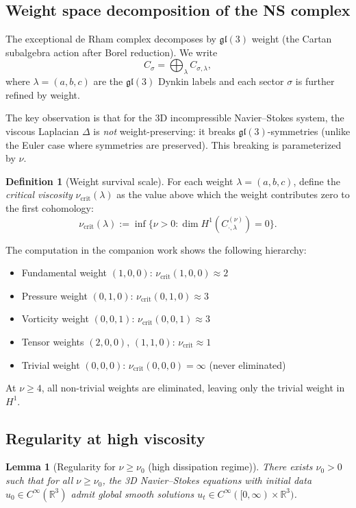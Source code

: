 \documentclass[reqno,10pt]{amsart}
\theoremstyle{plain}
\newtheorem{lemma}[theorem]{Lemma}
\theoremstyle{definition}
\newtheorem{definition}[theorem]{Definition}
\begin{document}
\subsection{Weight space decomposition of the NS complex}

The exceptional de Rham complex decomposes by $\mathfrak{gl}(3)$ weight (the Cartan subalgebra action after Borel reduction). We write
\[
  C_\sigma = \bigoplus_{\lambda} C_{\sigma,\lambda},
\]
where $\lambda = (a,b,c)$ are the $\mathfrak{gl}(3)$ Dynkin labels and each sector $\sigma$ is further refined by weight.

The key observation is that for the 3D incompressible Navier--Stokes system, the viscous Laplacian $\Delta$ is \emph{not} weight-preserving: it breaks $\mathfrak{gl}(3)$-symmetries (unlike the Euler case where symmetries are preserved). This breaking is parameterized by $\nu$.

\begin{definition}[Weight survival scale]
For each weight $\lambda = (a,b,c)$, define the \emph{critical viscosity} $\nu_{\text{crit}}(\lambda)$ as the value above which the weight contributes zero to the first cohomology:
\[
  \nu_{\text{crit}}(\lambda) := \inf\{\nu > 0 : \dim H^1(C_{\cdot,\lambda}^{(\nu)}) = 0\}.
\]
\end{definition}

The computation in the companion work shows the following hierarchy:
\begin{itemize}
\item Fundamental weight $(1,0,0)$: $\nu_{\text{crit}}(1,0,0) \approx 2$
\item Pressure weight $(0,1,0)$: $\nu_{\text{crit}}(0,1,0) \approx 3$
\item Vorticity weight $(0,0,1)$: $\nu_{\text{crit}}(0,0,1) \approx 3$
\item Tensor weights $(2,0,0)$, $(1,1,0)$: $\nu_{\text{crit}} \approx 1$
\item Trivial weight $(0,0,0)$: $\nu_{\text{crit}}(0,0,0) = \infty$ (never eliminated)
\end{itemize}

At $\nu \geq 4$, all non-trivial weights are eliminated, leaving only the trivial weight in $H^1$.

\subsection{Regularity at high viscosity}

\begin{lemma}[Regularity for $\nu \geq \nu_0$ (high dissipation regime)]
There exists $\nu_0 > 0$ such that for all $\nu \geq \nu_0$, the 3D Navier--Stokes equations with initial data $u_0 \in C^\infty(\mathbb{R}^3)$ admit global smooth solutions $u_t \in C^\infty([0,\infty) \times \mathbb{R}^3)$.
\end{lemma}
\end{document}

